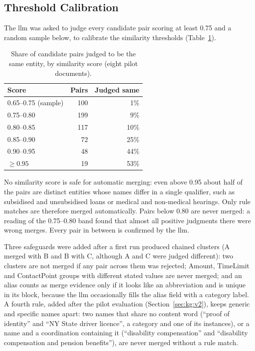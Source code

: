 \subsection{Threshold Calibration}

The \gls{llm} was asked to judge every candidate pair scoring at least 0.75 and a
random sample below, to calibrate the similarity thresholds
(Table~\ref{tab:kg:calibration}).

\begin{table}[ht]
    \centering
    \caption{Share of candidate pairs judged to be the same entity, by similarity
             score (eight pilot documents).}
    \label{tab:kg:calibration}
    \begin{tabular}{lrr}
        \toprule
        Score & Pairs & Judged same \\
        \midrule
        0.65--0.75 (sample) & 100 & 1\% \\
        0.75--0.80 & 199 & 9\% \\
        0.80--0.85 & 117 & 10\% \\
        0.85--0.90 &  72 & 25\% \\
        0.90--0.95 &  48 & 44\% \\
        $\geq 0.95$ &  19 & 53\% \\
        \bottomrule
    \end{tabular}
\end{table}

No similarity score is safe for automatic merging: even above 0.95 about half of the
pairs are distinct entities whose names differ in a single qualifier, such as
subsidised and unsubsidised loans or medical and non-medical hearings. Only rule
matches are therefore merged automatically. Pairs below 0.80 are never merged: a
reading of the 0.75--0.80 band found that almost all positive judgments there
were wrong merges. Every pair in between is confirmed by the \gls{llm}.

Three safeguards were added after a first run produced chained clusters (A merged
with B and B with C, although A and C were judged different): two clusters are not
merged if any pair across them was rejected; Amount, TimeLimit and ContactPoint
groups with different stated values are never merged; and an alias counts as merge
evidence only if it looks like an abbreviation and is unique in its block, because
the \gls{llm} occasionally fills the alias field with a category label. A fourth rule,
added after the pilot evaluation (Section~\ref{sec:kg:v2}), keeps generic and specific
names apart: two names that share no content word (``proof of identity'' and ``NY State
driver licence'', a category and one of its instances), or a name and a coordination
containing it (``disability compensation'' and ``disability compensation and pension
benefits''), are never merged without a rule match.

